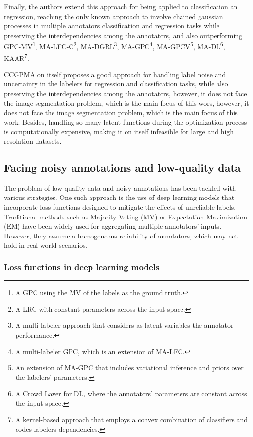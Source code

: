 Finally, the authors extend this approach for being applied to
classification an regression, reaching the only known approach to
involve chained gaussian processes in multiple annotators
classification and regression tasks while preserving the
interdependencies among the annotators, and also outperforming
GPC-MV\footnote{A GPC using the MV of the labels as the ground truth.},
MA-LFC-C\footnote{A LRC with constant parameters across the input space.},
MA-DGRL\footnote{A multi-labeler approach that considers as latent
variables the annotator performance.},
MA-GPC\footnote{A multi-labeler GPC, which is an extension of MA-LFC.},
MA-GPCV\footnote{An extension of MA-GPC that includes variational
inference and priors over the labelers' parameters.},
MA-DL\footnote{A Crowd Layer for DL, where the annotators' parameters
are constant across the input space.},
KAAR\footnote{A kernel-based approach that employs a convex
combination of classifiers and codes labelers dependencies.}.

\gls{CCGPMA} on itself proposes a good approach for handling label
noise and uncertainty in the labelers for regression and
classification tasks, while also preserving the interdependencies
among the annotators, however, it does not face the image segmentation
problem, which is the main focus of this wors, however, it does not
face the image segmentation problem, which is the main focus of this
work. Besides, handling so many latent functions during the
optimization process is computationally expensive, making it on itself
infeasible for large and high resolution datasets.

\subsection{Facing noisy annotations and low-quality data}

The problem of low-quality data and noisy annotations has been
tackled with various strategies. One such approach is the use of deep
learning models that incorporate loss functions designed to mitigate
the effects of unreliable labels. Traditional methods such as
Majority Voting (MV) or Expectation-Maximization (EM) have been
widely used for aggregating multiple annotators' inputs. However,
they assume a homogeneous reliability of annotators, which may not
hold in real-world scenarios.

\subsubsection{Loss functions in deep learning models}

